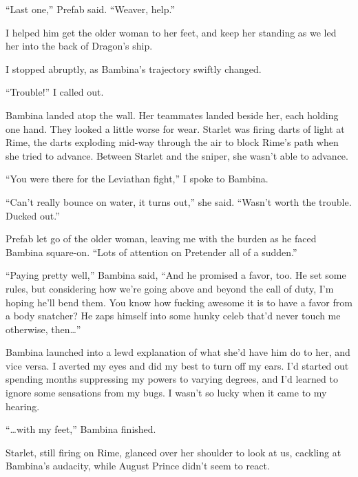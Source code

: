 ``Last one,'' Prefab said.  ``Weaver, help.''



I helped him get the older woman to her feet, and keep her standing as we led her into the back of Dragon's ship.



I stopped abruptly, as Bambina's trajectory swiftly changed.



``Trouble!'' I called out.



Bambina landed atop the wall.  Her teammates landed beside her, each holding one hand.  They looked a little worse for wear.  Starlet was firing darts of light at Rime, the darts exploding mid-way through the air to block Rime's path when she tried to advance.  Between Starlet and the sniper, she wasn't able to advance.



 ``You were there for the Leviathan fight,'' I spoke to Bambina.



``Can't really bounce on water, it turns out,'' she said.  ``Wasn't worth the trouble.  Ducked out.''



Prefab let go of the older woman, leaving me with the burden as he faced Bambina square-on.  ``Lots of attention on Pretender all of a sudden.''



``Paying pretty well,'' Bambina said, ``And he promised a favor, too.  He set some rules, but considering how we're going above and beyond the call of duty, I'm hoping he'll bend them.  You know how fucking awesome it is to have a favor from a body snatcher?  He zaps himself into some hunky celeb that'd never touch me otherwise, then\ldots''



Bambina launched into a lewd explanation of what she'd have him do to her, and vice versa.  I averted my eyes and did my best to turn off my ears.  I'd started out spending months suppressing my powers to varying degrees, and I'd learned to ignore some sensations from my bugs.  I wasn't so lucky when it came to my hearing.



``\ldots{}with my feet,'' Bambina finished.



Starlet, still firing on Rime, glanced over her shoulder to look at us, cackling at Bambina's audacity, while August Prince didn't seem to react.




